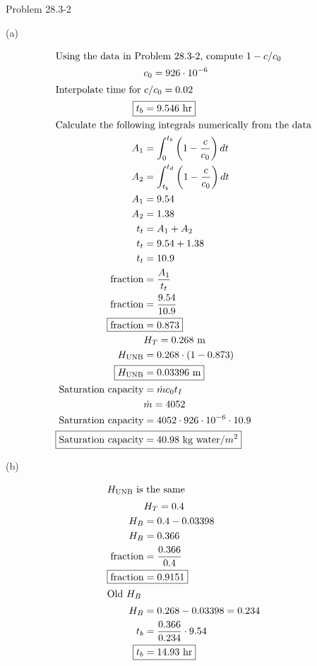 \item Problem 28.3-2

(a)

\begin{align*}
    \intertext{Using the data in Problem 28.3-2, compute $1-c/c_0$}
    & c_0 = 926 \cdot 10^{-6} \\
    \intertext{Interpolate time for $c/c_0=0.02$}
    \Aboxed{t_b &= 9.546 \text{ hr}} \\
    \intertext{Calculate the following integrals numerically from the data}
    A_1 &= \int_0^{t_b} \left(1 - \frac{c}{c_0}\right) dt \\
    A_2 &= \int_{t_b}^{t_d} \left(1 - \frac{c}{c_0}\right) dt \\
    A_1 &= 9.54 \\
    A_2 &= 1.38 \\
    t_t &= A_1 + A_2 \\
    t_t &= 9.54 + 1.38 \\
    t_t &= 10.9 \\
    \text{fraction} &= \frac{A_1}{t_t} \\
    \text{fraction} &= \frac{9.54}{10.9} \\
    \Aboxed{\text{fraction} &= 0.873} \\
    & H_T = 0.268 \text{ m} \\
    H_{\text{UNB}} &= 0.268 \cdot \left(1 - 0.873\right) \\
    \Aboxed{H_{\text{UNB}} &= 0.03396 \text{ m}} \\
    \text{Saturation capacity} &= \dot m c_0 t_I \\
    & \dot m = 4052 \\
    \text{Saturation capacity} &= 4052 \cdot 926 \cdot 10^{-6} \cdot 10.9 \\
    \Aboxed{\text{Saturation capacity} &= 40.98 \text{ kg water/$m^2$}}
\end{align*}

\newpage
(b)

\begin{align*}
    \intertext{$H_{\text{UNB}}$ is the same}
    & H_T = 0.4 \\
    H_B &= 0.4 - 0.03398 \\
    H_B &= 0.366 \\
    \text{fraction} &= \frac{0.366}{0.4} \\
    \Aboxed{\text{fraction} &= 0.9151} \\
    \intertext{Old $H_B$}
    H_B &= 0.268 - 0.03398 = 0.234 \\
    t_b &= \frac{0.366}{0.234} \cdot 9.54 \\
    \Aboxed{t_b &= 14.93 \text{ hr}}
\end{align*}